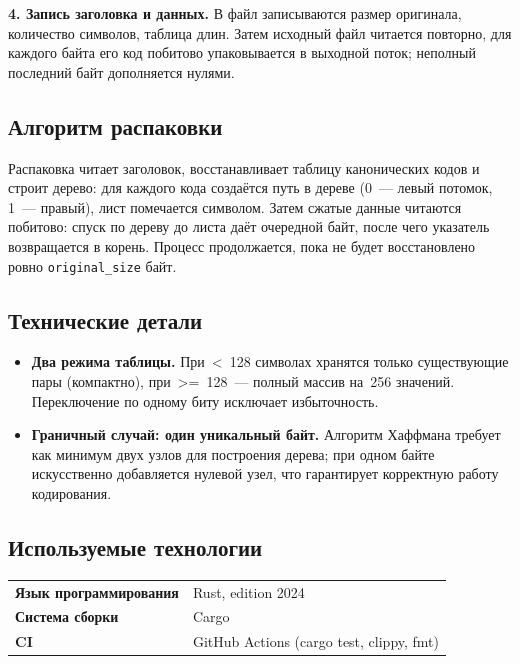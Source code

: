 \documentclass[a4paper]{article}
\begin{document}
\textbf{4. Запись заголовка и данных.} 
В файл записываются размер оригинала, количество символов, таблица длин. 
Затем исходный файл читается повторно, для каждого байта его код 
побитово упаковывается в выходной поток; неполный последний байт 
дополняется нулями.

\subsection{Алгоритм распаковки}

Распаковка читает заголовок, восстанавливает таблицу канонических кодов 
и строит дерево: для каждого кода создаётся путь в дереве (0~--- левый 
потомок, 1~--- правый), лист помечается символом. Затем сжатые данные 
читаются побитово: спуск по дереву до листа даёт очередной байт, после 
чего указатель возвращается в корень. Процесс продолжается, пока не будет 
восстановлено ровно \texttt{original\_size} байт.

\subsection{Технические детали}

\begin{itemize}
    \item \textbf{Два режима таблицы.} При~<~128 символах хранятся только 
          существующие пары (компактно), при~>=~128~--- полный массив на~256 
          значений. Переключение по одному биту 
          исключает избыточность.
    \item \textbf{Граничный случай: один уникальный байт.} Алгоритм Хаффмана 
          требует как минимум двух узлов для построения дерева; при одном 
          байте искусственно добавляется нулевой узел, что гарантирует 
          корректную работу кодирования.

\end{itemize}

\subsection{Используемые технологии}

\begin{tabular}{ll}
\textbf{Язык программирования} & Rust, edition 2024 \\
\textbf{Система сборки} & Cargo \\
\textbf{CI} & GitHub Actions (cargo test, clippy, fmt) \\
\end{tabular}
\end{document}
